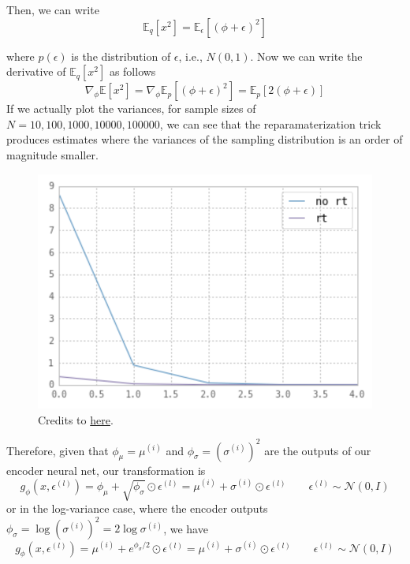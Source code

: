 \begin{example}[Gradient of Expection of $f(x) = x^2$ w.r.t. Gaussian]
    Then, we can write
    \begin{equation}
      \mathbb{E}_q[x^2] = \mathbb{E}_{\epsilon} [(\phi+ \epsilon)^2]
    \end{equation}

    where $p(\epsilon)$ is the distribution of $\epsilon$, i.e., $N(0,1)$. Now we can write the derivative of $\mathbb{E}_q[x^2]$ as
    follows
    \begin{equation}
      \nabla_\phi \mathbb{E}[x^2] = \nabla_\phi \mathbb{E}_p[(\phi+ \epsilon)^2] = \mathbb{E}_p[2(\phi+ \epsilon)]
    \end{equation}
    If we actually plot the variances, for sample sizes of $N = 10, 100, 1000, 10000, 100000$, we can see that the reparamaterization trick produces estimates where the variances of the sampling distribution is an order of magnitude smaller. 

    \begin{figure}[H]
      \centering 
      \includegraphics[scale=0.6]{img/reparam.png}
      \caption{Credits to \href{https://stats.stackexchange.com/questions/199605/how-does-the-reparameterization-trick-for-vaes-work-and-why-is-it-important}{here}.} 
      \label{fig:reparam}
    \end{figure}
  \end{example}

  Therefore, given that $\phi_\mu = \mu^{(i)}$ and $\phi_\sigma = (\sigma^{(i)})^2$ are the outputs of our encoder neural net, our transformation is 
  \begin{equation}
    g_\phi (x, \epsilon^{(l)}) = \phi_\mu + \sqrt{\phi_\sigma} \odot \epsilon^{(l)} = \mu^{(i)} + \sigma^{(i)} \odot \epsilon^{(l)} \qquad \epsilon^{(l)} \sim \mathcal{N}(0, I)
  \end{equation}
  or in the log-variance case, where the encoder outputs $\phi_\sigma = \log (\sigma^{(i)})^2 = 2 \log \sigma^{(i)}$, we have 
  \begin{equation}
    g_\phi (x, \epsilon^{(l)}) = \mu^{(i)} + e^{\phi_\sigma/2} \odot \epsilon^{(l)} = \mu^{(i)} + \sigma^{(i)} \odot \epsilon^{(l)} \qquad \epsilon^{(l)} \sim \mathcal{N}(0, I)
  \end{equation}

